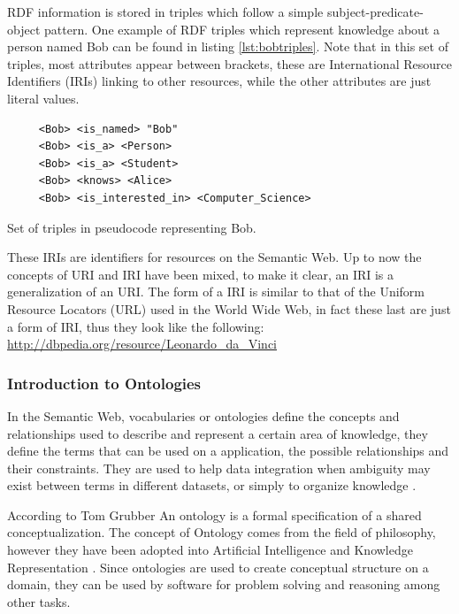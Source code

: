 RDF information is stored in triples which follow a simple subject-predicate-object pattern. One example of RDF triples which represent knowledge about a person named Bob can be found in listing \ref{lst:bobtriples}. Note that in this set of triples, most attributes appear between brackets, these are International Resource Identifiers (IRIs) linking to other resources, while the other attributes are just literal values. 

\begin{listing}\centering
  \begin{minipage}{.4\textwidth}
    \begin{verbatim}
     <Bob> <is_named> "Bob"
     <Bob> <is_a> <Person>
     <Bob> <is_a> <Student>
     <Bob> <knows> <Alice>
     <Bob> <is_interested_in> <Computer_Science>
    \end{verbatim}
  \end{minipage}
  \caption{Set of triples in pseudocode representing Bob.}\label{lst:bobtriples}
\end{listing}

These IRIs are identifiers for resources on the Semantic Web. Up to now the concepts of URI and IRI have been mixed, to make it clear, an IRI is a generalization of an URI. The form of a IRI is similar to that of the Uniform Resource Locators (URL) used in the World Wide Web, in fact these last are just a form of IRI, thus they look like the following:  \url{http://dbpedia.org/resource/Leonardo_da_Vinci}
 

\subsubsection{Introduction to Ontologies}

In the Semantic Web, vocabularies or ontologies define the concepts and relationships used to describe and represent a certain area of knowledge, they define the terms that can be used on a application, the possible relationships and their constraints. They are used to help data integration when ambiguity may exist between terms in different datasets, or simply to organize knowledge \cite{w3contologies}.

According to Tom Grubber \cite{gruber1993ontology} An ontology is a formal specification of a shared conceptualization. The concept of Ontology comes from the field of philosophy, however they have been adopted into Artificial Intelligence and Knowledge Representation \cite{chandrasekaran1999ontologies}. Since ontologies are used to create conceptual structure on a domain, they can be used by software for problem solving and reasoning among other tasks.

